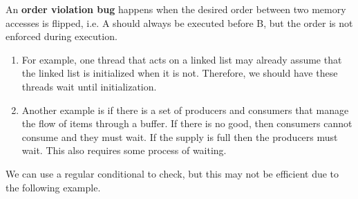 \documentclass{article}
\newcounter{definition}[section]
\newcounter{example}[section]
\begin{document}
    \begin{definition}
      \label{def:order-violation-bugs}
      An \textbf{order violation bug} happens when the desired order between two memory accesses is flipped, i.e. A should always be executed before B, but the order is not enforced during execution. 
      \begin{enumerate}
        \item For example, one thread that acts on a linked list may already assume that the linked list is initialized when it is not. Therefore, we should have these threads wait until initialization. 
        \item Another example is if there is a set of producers and consumers that manage the flow of items through a buffer. If there is no good, then consumers cannot consume and they must wait. If the supply is full then the producers must wait. This also requires some process of waiting. 
      \end{enumerate}
    \end{definition}

    We can use a regular conditional to check, but this may not be efficient due to the following example. 
\end{document}

